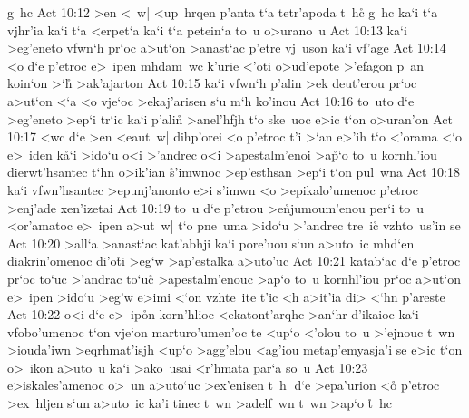 g~hc\bibvsend
\vs Act 10:12
>en
<~w|
<up~hrqen
p'anta
t`a
tetr'apoda
t~hc\r{}
g~hc
ka`i
t`a
vjhr'ia
ka`i
t`a
<erpet`a
ka`i
t`a
petein`a
to~u
o>urano~u\bibvsend
\vs Act 10:13
ka`i
>eg'eneto
vfwn`h
pr`oc
a>ut`on
>anast`ac
p'etre
vj~uson
ka`i
vf'age\bibvsend
\vs Act 10:14
<o
d`e
p'etroc
e>~ipen
mhdam~wc
k'urie
<'oti
o>ud'epote
>'efagon
p~an
koin`on
>`h\r{}
>ak'ajarton\bibvsend
\vs Act 10:15
ka`i
vfwn`h
p'alin
>ek
deut'erou
pr`oc
a>ut`on
<`a
<o
vje`oc
>ekaj'arisen
s`u
m`h
ko'inou\bibvsend
\vs Act 10:16
to~uto
d`e
>eg'eneto
>ep`i
tr`ic
ka`i
p'alin\r{}
>anel'hfjh
t`o
ske~uoc
e>ic
t`on
o>uran'on\bibvsend
\vs Act 10:17
<wc
d`e
>en
<eaut~w|
dihp'orei
<o
p'etroc
t'i
>`an
e>'ih
t`o
<'orama
<`o
e>~iden
k\r{a}`i
>ido`u
o<i
>'andrec
o<i
>apestalm'enoi
>a\r{p}`o
to~u
kornhl'iou
dierwt'hsantec
t`hn
o>ik'ian
\r{s}'imwnoc
>ep'esthsan
>ep`i
t`on
pul~wna\bibvsend
\vs Act 10:18
ka`i
vfwn'hsantec
>epunj'anonto
e>i
s'imwn
<o
>epikalo'umenoc
p'etroc
>enj'ade
xen'izetai\bibvsend
\vs Act 10:19
to~u
d`e
p'etrou
>e\r{n}jumoum'enou
per`i
to~u
<or'amatoc
e>~ipen
a>ut~w|
t`o
pne~uma
>ido`u
>'andrec
tre~ic\r{}
vzhto~us'in
se\bibvsend
\vs Act 10:20
>all`a
>anast`ac
kat'abhji
ka`i
pore'uou
s`un
a>uto~ic
mhd`en
diakrin'omenoc
di'o\r{t}i
>eg`w
>ap'estalka
a>uto'uc\bibvsend
\vs Act 10:21
katab`ac
d`e
p'etroc
pr`oc
to`uc
>'andrac
to`uc\r{}
>apestalm'enouc
>ap`o
to~u
kornhl'iou
pr`oc
a>ut`on
e>~ipen
>ido`u
>eg'w
e>imi
<`on
vzhte~ite
t'ic
<h
a>it'ia
di>
<`hn
p'areste\bibvsend
\vs Act 10:22
o<i
d`e
e>~ip\r{o}n
korn'hlioc
<ekatont'arqhc
>an`hr
d'ikaioc
ka`i
vfobo'umenoc
t`on
vje`on
marturo'umen'oc
te
<up`o
<'olou
to~u
>'ejnouc
t~wn
>iouda'iwn
>eqrhmat'isjh
<up`o
>agg'elou
<ag'iou
metap'emyasja'i
se
e>ic
t`on
o>~ikon
a>uto~u
ka`i
>ako~usai
<r'hmata
par`a
so~u\bibvsend
\vs Act 10:23
e>iskales'amenoc
o>~un
a>uto`uc
>ex'enisen
t~h|
d`e
>epa'urion
<o\r{}
p'etroc
>ex~hljen
s`un
a>uto~ic
ka'i
tinec
t~wn
>adelf~wn
t~wn
>ap`o
\r{t}~hc
